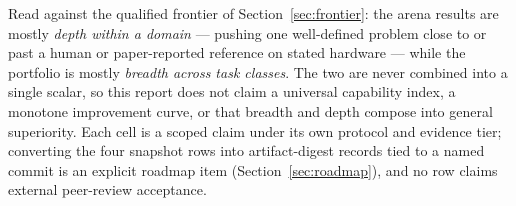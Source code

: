 Read against the qualified frontier of Section~\ref{sec:frontier}: the arena results
are mostly \emph{depth within a domain} --- pushing one well-defined problem close to
or past a human or paper-reported reference on stated hardware --- while the portfolio
is mostly \emph{breadth across task classes}. The two are never combined into a single
scalar, so this report does not claim a universal capability index, a monotone
improvement curve, or that breadth and depth compose into general superiority. Each
cell is a scoped claim under its own protocol and evidence tier; converting the four
snapshot rows into artifact-digest records tied to a named commit is an explicit
roadmap item (Section~\ref{sec:roadmap}), and no row claims external peer-review
acceptance.
